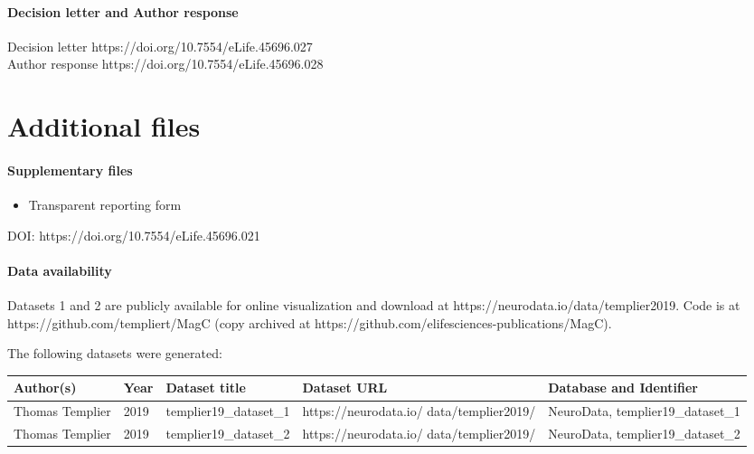 \documentclass{article}
\begin{document}
\paragraph{Decision letter and Author response}
Decision letter https://doi.org/10.7554/eLife.45696.027\\
Author response https://doi.org/10.7554/eLife.45696.028

\section*{Additional files}

\paragraph{Supplementary files}\leavevmode
\begin{itemize}
\item Transparent reporting form
\end{itemize}
\noindent DOI: https://doi.org/10.7554/eLife.45696.021

\paragraph{Data availability}
Datasets 1 and 2 are publicly available for online visualization and download at https://neurodata.io/data/templier2019. Code is at https://github.com/templiert/MagC (copy archived at https://github.com/elifesciences-publications/MagC).

\noindent The following datasets were generated:

{\small\noindent\begin{tabular}{@{}p{2.6cm}p{0.9cm}p{3.1cm}p{3.2cm}p{3.6cm}@{}}
\toprule
\textbf{Author(s)} & \textbf{Year} & \textbf{Dataset title} & \textbf{Dataset URL} & \textbf{Database and Identifier} \\
\midrule
Thomas Templier & 2019 & templier19\_dataset\_1 & https://neurodata.io/ data/templier2019/ & NeuroData, templier19\_dataset\_1 \\
Thomas Templier & 2019 & templier19\_dataset\_2 & https://neurodata.io/ data/templier2019/ & NeuroData, templier19\_dataset\_2 \\
\bottomrule
\end{tabular}}
\end{document}
